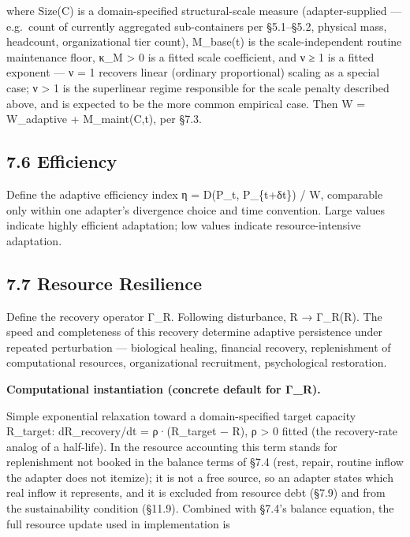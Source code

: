 \documentclass[
]{article}
\begin{document}
where Size(C) is a domain-specified structural-scale measure
(adapter-supplied --- e.g.~count of currently aggregated sub-containers
per §5.1--§5.2, physical mass, headcount, organizational tier count),
M\_base(t) is the scale-independent routine maintenance floor, κ\_M
\textgreater{} 0 is a fitted scale coefficient, and ν ≥ 1 is a fitted
exponent --- ν = 1 recovers linear (ordinary proportional) scaling as a
special case; ν \textgreater{} 1 is the superlinear regime responsible
for the scale penalty described above, and is expected to be the more
common empirical case. Then W = W\_adaptive + M\_maint(C,t), per §7.3.

\hypertarget{efficiency}{%
\subsection{7.6 Efficiency}\label{efficiency}}

Define the adaptive efficiency index η = D(P\_t, P\_\{t+δt\}) / W,
comparable only within one adapter's divergence choice and time
convention. Large values indicate highly efficient adaptation; low
values indicate resource-intensive adaptation.

\hypertarget{resource-resilience}{%
\subsection{7.7 Resource Resilience}\label{resource-resilience}}

Define the recovery operator Γ\_R. Following disturbance, R → Γ\_R(R).
The speed and completeness of this recovery determine adaptive
persistence under repeated perturbation --- biological healing,
financial recovery, replenishment of computational resources,
organizational recruitment, psychological restoration.

\textbf{Computational instantiation (concrete default for Γ\_R).}

Simple exponential relaxation toward a domain-specified target capacity
R\_target: dR\_recovery/dt = ρ·(R\_target − R), ρ \textgreater{} 0
fitted (the recovery-rate analog of a half-life). In the resource
accounting this term stands for replenishment not booked in the balance
terms of §7.4 (rest, repair, routine inflow the adapter does not
itemize); it is not a free source, so an adapter states which real
inflow it represents, and it is excluded from resource debt (§7.9) and
from the sustainability condition (§11.9). Combined with §7.4's balance
equation, the full resource update used in implementation is
\end{document}
